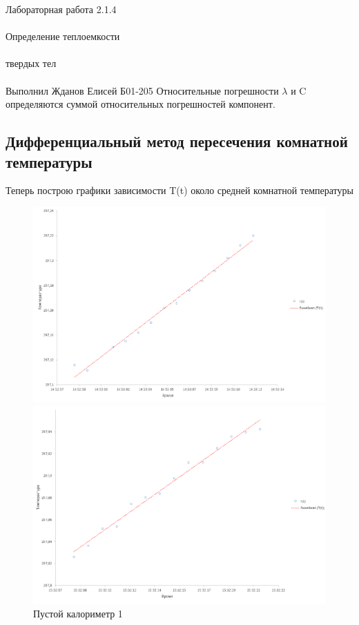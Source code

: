 \documentclass{astroedu-lab}
\begin{document}
\begin{problem}{\huge Лабораторная работа 2.1.4\\\\Определение теплоемкости\\\\твердых тел\\\\Выполнил Жданов Елисей Б01-205}
Относительные погрешности $\lambda$ и C определяются суммой относительных погрешностей компонент.

\subsection{Дифференциальный метод пересечения комнатной\\ температуры}

Теперь построю графики зависимости T(t) около средней комнатной температуры

\begin{figure}
		\begin{center}
			\begin{minipage}[h]{0.48\linewidth}
				\includegraphics[width=1\linewidth]{картинки/2023-02-11_22-50-46.png}
				\caption{Пустой калориметр 1} %
				\label{ris:dR_dt(r)_for_calorimetr} %
			\end{minipage}
		\hfill
			\begin{minipage}[h]{0.48\linewidth}
				\includegraphics[width=1\linewidth]{картинки/2023-02-11_22-51-37.png}

\end{minipage}
\end{center}
\end{figure}
\end{problem}
\end{document}
